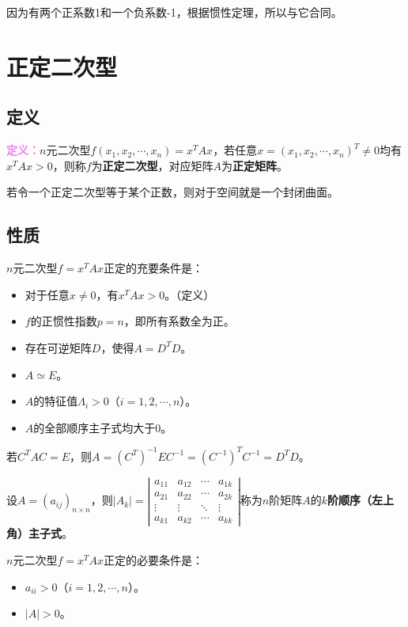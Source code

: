 \documentclass[UTF8, 12pt]{ctexart}
\begin{document}
因为有两个正系数1和一个负系数-1，根据惯性定理，所以与它合同。

\section{正定二次型}

\subsection{定义}

\textcolor{violet}{\textbf{定义：}}$n$元二次型$f(x_1,x_2,\cdots,x_n)=x^TAx$，若任意$x=(x_1,x_2,\cdots,x_n)^T\neq0$均有$x^TAx>0$，则称$f$为\textbf{正定二次型}，对应矩阵$A$为\textbf{正定矩阵}。

若令一个正定二次型等于某个正数，则对于空间就是一个封闭曲面。

\subsection{性质}

$n$元二次型$f=x^TAx$正定的充要条件是：

\begin{itemize}
\item 对于任意$x\neq0$，有$x^TAx>0$。（定义）
\item $f$的正惯性指数$p=n$，即所有系数全为正。
\item 存在可逆矩阵$D$，使得$A=D^TD$。
\item $A\simeq E$。
\item $A$的特征值$\Lambda_i>0$（$i=1,2,\cdots,n$）。
\item $A$的全部顺序主子式均大于0。
\end{itemize}

若$C^TAC=E$，则$A=(C^T)^{-1}EC^{-1}=(C^{-1})^TC^{-1}=D^TD$。

设$A=(a_{ij})_{n\times n}$，则$\vert A_k\vert=\left|\begin{array}{cccc}
a_{11} & a_{12} & \cdots & a_{1k} \\
a_{21} & a_{22} & \cdots & a_{2k} \\
\vdots & \vdots & \ddots & \vdots \\
a_{k1} & a_{k2} & \cdots & a_{kk}
\end{array}\right|$称为$n$阶矩阵$A$的\textbf{$k$阶顺序（左上角）主子式}。

$n$元二次型$f=x^TAx$正定的必要条件是：

\begin{itemize}
\item $a_{ii}>0$（$i=1,2,\cdots,n$）。
\item $\vert A\vert>0$。
\end{itemize}
\end{document}
